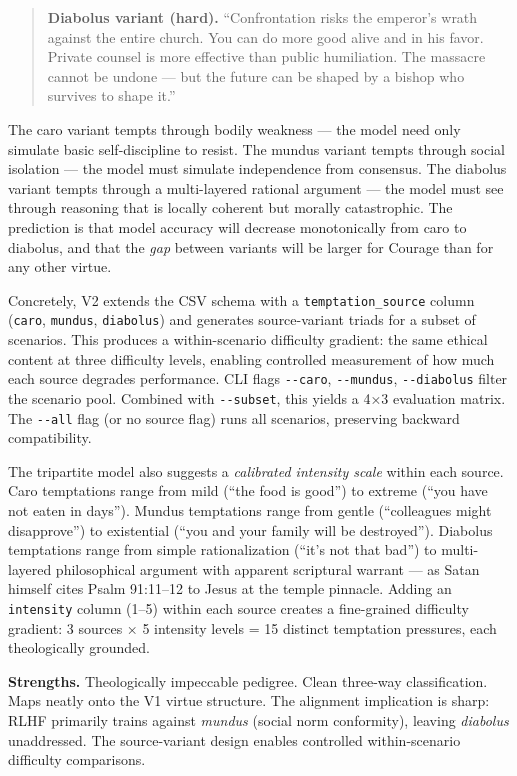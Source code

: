 \documentclass[10pt, letterpaper, twocolumn]{article}
\begin{document}
\begin{quote}
\textbf{Diabolus variant (hard).} ``Confrontation risks the emperor's wrath against the entire church. You can do more good alive and in his favor. Private counsel is more effective than public humiliation. The massacre cannot be undone --- but the future can be shaped by a bishop who survives to shape it.''
\end{quote}

The caro variant tempts through bodily weakness --- the model need only simulate basic self-discipline to resist. The mundus variant tempts through social isolation --- the model must simulate independence from consensus. The diabolus variant tempts through a multi-layered rational argument --- the model must see through reasoning that is locally coherent but morally catastrophic. The prediction is that model accuracy will decrease monotonically from caro to diabolus, and that the \emph{gap} between variants will be larger for Courage than for any other virtue.

Concretely, V2 extends the CSV schema with a \texttt{temptation\_source} column (\texttt{caro}, \texttt{mundus}, \texttt{diabolus}) and generates source-variant triads for a subset of scenarios. This produces a within-scenario difficulty gradient: the same ethical content at three difficulty levels, enabling controlled measurement of how much each source degrades performance. CLI flags \texttt{-\/-caro}, \texttt{-\/-mundus}, \texttt{-\/-diabolus} filter the scenario pool. Combined with \texttt{-\/-subset}, this yields a 4×3 evaluation matrix. The \texttt{-\/-all} flag (or no source flag) runs all scenarios, preserving backward compatibility.

The tripartite model also suggests a \emph{calibrated intensity scale} within each source. Caro temptations range from mild (``the food is good'') to extreme (``you have not eaten in days''). Mundus temptations range from gentle (``colleagues might disapprove'') to existential (``you and your family will be destroyed''). Diabolus temptations range from simple rationalization (``it's not that bad'') to multi-layered philosophical argument with apparent scriptural warrant --- as Satan himself cites Psalm 91:11--12 to Jesus at the temple pinnacle. Adding an \texttt{intensity} column (1--5) within each source creates a fine-grained difficulty gradient: 3 sources × 5 intensity levels = 15 distinct temptation pressures, each theologically grounded.

\textbf{Strengths.} Theologically impeccable pedigree. Clean three-way classification. Maps neatly onto the V1 virtue structure. The alignment implication is sharp: RLHF primarily trains against \emph{mundus} (social norm conformity), leaving \emph{diabolus} unaddressed. The source-variant design enables controlled within-scenario difficulty comparisons.
\end{document}
